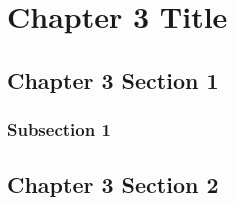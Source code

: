 \chapter{Chapter 3 Title}
\section{Chapter 3 Section 1}
\subsection{Subsection 1}
\section{Chapter 3 Section 2}